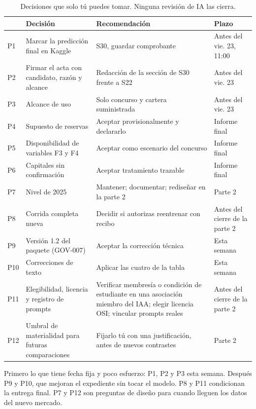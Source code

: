 \documentclass[11pt,a4paper]{article}
\begin{document}
\begin{table}[H]
\centering\small
\begin{tabularx}{\linewidth}{@{}P{0.7cm}P{3.6cm}LP{2.4cm}@{}}
\toprule
 & Decisión & Recomendación & Plazo \\
\midrule
P1 & Marcar la predicción final en Kaggle & S30, guardar comprobante & Antes del vie. 23, 11:00 \\
P2 & Firmar el acta con candidato, razón y alcance & Redacción de la sección de S30 frente a S22 & Antes del vie. 23 \\
P3 & Alcance de uso & Solo concurso y cartera suministrada & Antes del vie. 23 \\
P4 & Supuesto de reservas & Aceptar provisionalmente y declararlo & Informe final \\
P5 & Disponibilidad de variables F3 y F4 & Aceptar como escenario del concurso & Informe final \\
P6 & Capitales sin confirmación & Aceptar tratamiento trazable & Informe final \\
P7 & Nivel de 2025 & Mantener; documentar; rediseñar en la parte 2 & Parte 2 \\
P8 & Corrida completa nueva & Decidir si autorizas reentrenar con recibo & Antes del cierre de la parte 2 \\
P9 & Versión 1.2 del paquete (GOV-007) & Aceptar la corrección técnica & Esta semana \\
P10 & Correcciones de texto & Aplicar las cuatro de la tabla & Esta semana \\
P11 & Elegibilidad, licencia y registro de prompts & Verificar membresía o condición de estudiante en una asociación miembro del IAA; elegir licencia OSI; vincular prompts reales & Antes del cierre de la parte 2 \\
P12 & Umbral de materialidad para futuras comparaciones & Fijarlo tú con una justificación, antes de nuevos contrastes & Parte 2 \\
\bottomrule
\end{tabularx}
\caption{Decisiones que solo tú puedes tomar. Ninguna revisión de IA las cierra.}
\end{table}

\begin{clave}
Primero lo que tiene fecha fija y poco esfuerzo: P1, P2 y P3 esta semana. Después P9 y P10, que mejoran el expediente sin tocar el modelo. P8 y P11 condicionan la entrega final. P7 y P12 son preguntas de diseño para cuando lleguen los datos del nuevo mercado.
\end{clave}
\end{document}
